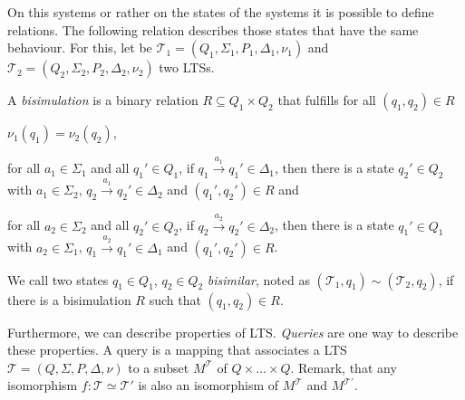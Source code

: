 On this systems or rather on the states of the systems it is possible to define relations. The
following relation describes those states that have the same behaviour. For this, let be $\mathcal{T}_1 = (Q_1,
\Sigma_1, P_1, \Delta_1, \nu_1)$ and $\mathcal{T}_2 = (Q_2, \Sigma_2, P_2, \Delta_2, \nu_2)$ two LTSs.

\begin{definition}
    A \emph{bisimulation} is a binary relation $R \subseteq Q_1 \times Q_2$ that fulfills for all $(q_1, q_2) \in R$
    \begin{compactitem}
        \item $\nu_1 (q_1) = \nu_2 (q_2)$,
        \item for all $a_1 \in \Sigma_1$ and all $q_1' \in Q_1$, if $q_1 \overset{a_1}{\rightarrow} q_1' \in
        \Delta_1$, then there is a state $q_2' \in Q_2$ with $a_1 \in \Sigma_2$, $q_2
        \overset{a_1}{\rightarrow} q_2' \in \Delta_2$ and $(q_1', q_2') \in R$ and
        \item for all $a_2 \in \Sigma_2$ and all $q_2' \in Q_2$, if $q_2 \overset{a_2}{\rightarrow} q_2' \in
        \Delta_2$, then there is a state $q_1' \in Q_1$ with $a_2 \in \Sigma_1$, $q_1
        \overset{a_2}{\rightarrow} q_1' \in \Delta_1$ and $(q_1', q_2') \in R$.
    \end{compactitem}
    We call two states $q_1 \in Q_1$, $q_2 \in Q_2$ \emph{bisimilar}, noted as $(\mathcal{T}_1, q_1) \sim
    (\mathcal{T}_2, q_2)$, if there
    is a bisimulation $R$ such that $(q_1, q_2) \in R$.
\end{definition}

Furthermore, we can describe properties of LTS. \textit{Queries} are one way to describe these properties. A query
is a mapping that associates a LTS $\mathcal{T} = (Q, \Sigma, P, \Delta, \nu)$ to a subset
$M^{\mathcal{T}}$ of $Q \times \dots \times Q$. Remark, that any isomorphism $f: \mathcal{T} \simeq
\mathcal{T}'$ is also an isomorphism of $M^{\mathcal{T}}$ and $M^{{\mathcal{T}}'}$.

